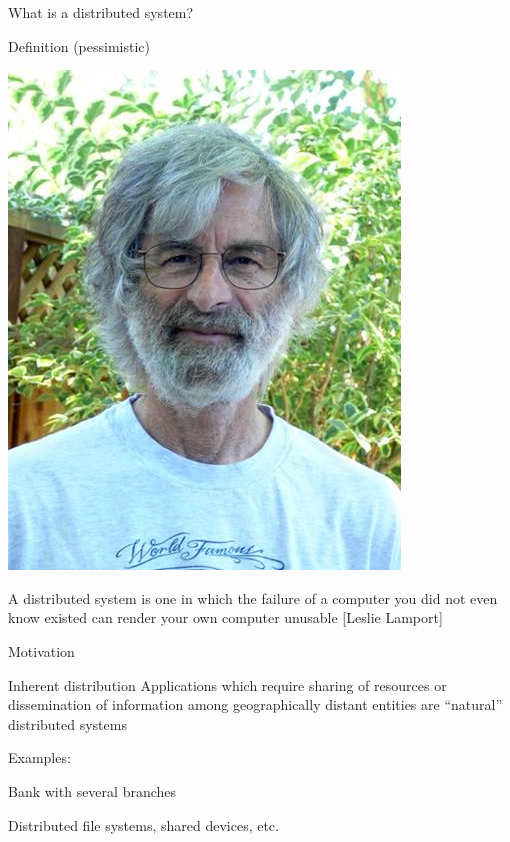\begin{frame}{What is a distributed system?}
\pause
\smallskip
\begin{block}{Definition (pessimistic)}
\begin{minipage}{0.15\textwidth}
\includegraphics[width=\textwidth]{leslie.jpg}
\end{minipage}
\hfill
\begin{minipage}{0.80\textwidth}
A distributed system is one in which the failure of a computer you did not even know existed can render your own computer unusable [Leslie Lamport]
\end{minipage}
\end{block}

\end{frame}

\begin{frame}{Motivation}
\begin{block}{Inherent distribution}
Applications which require sharing of resources or dissemination of information among geographically
distant entities are “natural” distributed systems
\end{block}

\bigskip
Examples:
\BI
\item Bank with several branches
\item Distributed file systems, shared devices, etc.
\EI
\end{frame}

